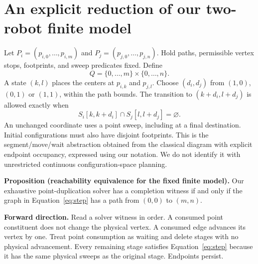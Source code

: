 \documentclass[11pt,a4paper]{article}
\begin{document}
\clearpage
\section{An explicit reduction of our two-robot finite model}
Let $P_i=(p_{i,0},\ldots,p_{i,m})$ and
$P_j=(p_{j,0},\ldots,p_{j,n})$. Hold paths, permissible vertex stops,
footprints, and sweep predicates fixed. Define
\begin{equation}
Q=\{0,\ldots,m\}\times\{0,\ldots,n\}.
\end{equation}
A state $(k,l)$ places the centers at $p_{i,k}$ and $p_{j,l}$.
Choose $(d_i,d_j)$ from $(1,0)$, $(0,1)$ or $(1,1)$, within the path bounds.
The transition to $(k+d_i,l+d_j)$ is allowed exactly when
\begin{equation}
S_i[k,k+d_i]\cap S_j[l,l+d_j]=\varnothing.\label{eq:step}
\end{equation}
An unchanged coordinate uses a point sweep, including at a final destination.
Initial configurations must also have disjoint footprints. This is the
segment/move/wait abstraction obtained from the classical diagram with explicit
endpoint occupancy, expressed using our notation. We do not identify it with
unrestricted continuous configuration-space planning.

\begin{center}
\end{center}

\textbf{Proposition (reachability equivalence for the fixed finite model).}
Our exhaustive point-duplication solver has a completion witness if and only if
the graph in Equation~\eqref{eq:step} has a path from $(0,0)$ to $(m,n)$.

\textbf{Forward direction.} Read a solver witness in order. A consumed point
constituent does not change the physical vertex. A consumed edge advances its
vertex by one. Treat point consumption as waiting and delete stages with no
physical advancement. Every remaining stage satisfies Equation~\eqref{eq:step}
because it has the same physical sweeps as the original stage. Endpoints persist.
\end{document}
